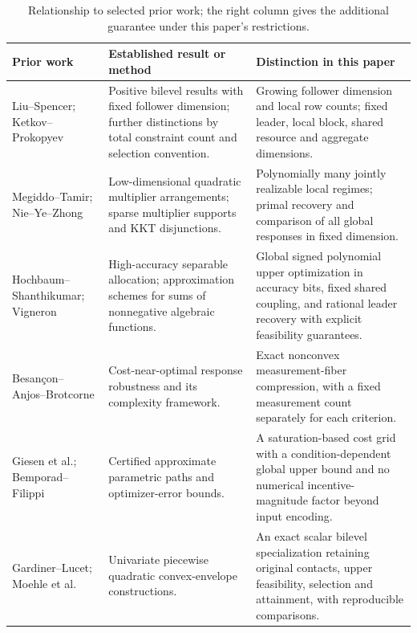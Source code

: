 \begin{table}[t]
\centering\small
\caption{Relationship to selected prior work; the right column gives the
additional guarantee under this paper's restrictions.}
\label{tab:prior-comparison}
\begin{tabular}{@{}>{\raggedright\arraybackslash}p{.23\linewidth}>{\raggedright\arraybackslash}p{.32\linewidth}>{\raggedright\arraybackslash}p{.39\linewidth}@{}}
\toprule
Prior work & Established result or method & Distinction in this paper\\\midrule
Liu--Spencer; Ketkov--Prokopyev
\cite{LiuSpencer1995,KetkovProkopyev2026} &
Positive bilevel results with fixed follower dimension; further distinctions
by total constraint count and selection convention. &
Growing follower dimension and local row counts; fixed leader, local block,
shared resource and aggregate dimensions.\\[5pt]
Megiddo--Tamir; Nie--Ye--Zhong
\cite{MegiddoTamir1993,NieYeZhong2026} &
Low-dimensional quadratic multiplier arrangements; sparse multiplier
supports and KKT disjunctions. &
Polynomially many jointly realizable local regimes; primal recovery and
comparison of all global responses in fixed dimension.\\[5pt]
Hochbaum--Shanthikumar; Vigneron
\cite{HochbaumShanthikumar1990,Vigneron2014} &
High-accuracy separable allocation; approximation schemes for sums of
nonnegative algebraic functions. &
Global signed polynomial upper optimization in accuracy bits, fixed shared
coupling, and rational leader recovery with explicit feasibility guarantees.\\[5pt]
Besan\c{c}on--Anjos--Brotcorne
\cite{BesanconAnjosBrotcorne2024,BesanconAnjosBrotcorne2021} &
Cost-near-optimal response robustness and its complexity framework. &
Exact nonconvex measurement-fiber compression, with a fixed measurement count
separately for each criterion.\\[5pt]
Giesen et al.; Bemporad--Filippi
\cite{GiesenJaggiLaue2012,GiesenEtAl2012,BemporadFilippi2001} &
Certified approximate parametric paths and optimizer-error bounds. &
A saturation-based cost grid with a condition-dependent global upper bound
and no numerical incentive-magnitude factor beyond input encoding.\\[5pt]
Gardiner--Lucet; Moehle et al.
\cite{GardinerLucet2010,MoehleEtAl2023} &
Univariate piecewise quadratic convex-envelope constructions. &
An exact scalar bilevel specialization retaining original contacts, upper
feasibility, selection and attainment, with reproducible comparisons.\\
\bottomrule
\end{tabular}
\end{table}

